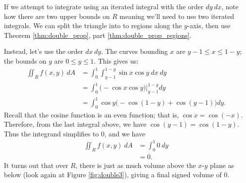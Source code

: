 {If we attempt to integrate using an iterated integral with the order $dy\ dx$, note how there are two upper bounds on $R$ meaning we'll need to use two iterated integrals. We can split the triangle into to regions along the $y$-axis, then use Theorem \ref{thm:double_prop}, part \ref{thm:double_prop_regions}.

Instead, let's use the order $dx\ dy$. The curves bounding $x$ are $y-1\leq x\leq 1-y$; the bounds on $y$ are $0\leq y\leq 1$. This gives us:
\begin{align*}
\iint_R f(x,y)\ dA &= \int_0^1\int_{y-1}^{1-y}\sin x\cos y\ dx\ dy\\
		&= \int_0^1\left.\Big( -\cos x\cos y\Big)\right|_{y-1}^{1-y}dy\\
		&= \int_0^1 \cos y\Big(-\cos (1-y) + \cos(y-1)\Big)dy.
\end{align*}
Recall that the cosine function is an even function; that is, $\cos x = \cos (-x)$. Therefore, from the last integral above, we have $\cos (y-1) = \cos (1-y)$. Thus the integrand simplifies to 0, and we have 
\begin{align*}
\iint_R f(x,y)\ dA &= \int_0^1 0\ dy \\
&= 0.
\end{align*}
It turns out that over $R$, there is just as much volume above the $x$-$y$ plane as below (look again at Figure \ref{fig:double3}), giving a final signed volume of 0. 
}\\


